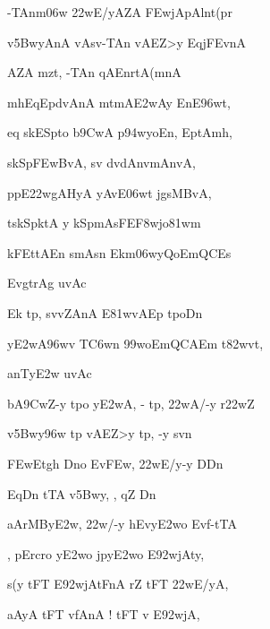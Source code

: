 {\dn -TAnm\4\306w\2 \322wE/yAZA\2 \3FEwjApAlnt(pr \dontdisplaylinenum}

{\dn v\4\35BwyAnA\2 vAsv-TAn\2 vAEZ>y\2 EqjFEvnA \vegdn\dontdisplaylinenum}

{\dn {}AZA\2 mzt, -TAn\2 qAEnrtA(mnA \dontdisplaylinenum}

{\dn mhEq\0Epd\?vAnA\2 mtmA\3E2wAy EnE\396wt,{\dandadn}\dontdisplaylinenum }

{\dn eq s\2kESpto b\5\39CwA p\394wyoEn, EptAmh, \vegdn\dontdisplaylinenum}

{\dn s\2kSp\3FEwBvA, sv\?{\qvb} d\?vdAnvmAnvA,{\dandabdn} \dontdisplaylinenum}

{\dn ppE\322wgAHyA yAvE\306wt jgsMBvA, \vegdn\dontdisplaylinenum}

{\dn {}ts\2kSpktA\0 y kSpmAsFE\3F8wjo\381wm{\dandabdn} \dontdisplaylinenum}

{\dn kFEt\0tAEn smAs\?n Ekm\306wyQoEmQCEs \vegdn\dontdisplaylinenum}

{\dn EvgtrAg uvAc{\dandabdn}\dontdisplaylinenum }

{\dn Ek\2 tp, sv\0vZA\0nA\2 E\381wvA\0Ep tpoDn{\dandadn} \dontdisplaylinenum}

{\dn y\3E2wA\396w\4v T\3C6w\?n \399woEmQCAEm t\382wvt, \vegdn\dontdisplaylinenum}

{\dn anT\0y\3E2w uvAc{\dandabdn}\dontdisplaylinenum }

{\dn b\5A\39CwZ-y tpo y\3E2wA, {\rs -\re} tp, \322wA/-y r\322wZ \dontdisplaylinenum}

{\dn v\4\35Bwy\396w tp vAEZ>y tp, -y s\?vn \vegdn\dontdisplaylinenum}

{\dn \3FEwEtg\5h Dno Ev\3FEw, \322wE/y-y DD\0n \dontdisplaylinenum}

{\dn {}EqD\0n\2 tTA v\4\35Bwy, , qZ\2 Dn \vegdn\dontdisplaylinenum}

{\dn aArMBy\3E2w, \322w/-y hEvy\0\3E2wo Evf-tTA{\dandabdn} \dontdisplaylinenum}

{\dn {}, pErcro y\3E2wo jpy\3E2wo E\392wjAty, \vegdn\dontdisplaylinenum}

{\dn s(y tFT\0 E\392wjAtFnA\2 rZ tFT{\rdt}  \322wE/yA,{\dandabdn} \dontdisplaylinenum}

{\dn aAyA\0 tFT{\rdt}  v\4fAnA\2 {\rs !\re} tFT{\rdt}  v\4 E\392wjA, \vegdn\dontdisplaylinenum}

